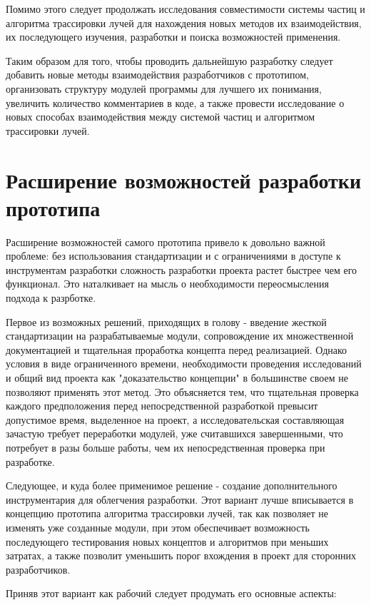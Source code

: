 Помимо этого следует продолжать исследования совместимости системы частиц и алгоритма трассировки лучей для нахождения новых методов их взаимодействия, их последующего изучения, разработки и поиска возможностей применения.

Таким образом для того, чтобы проводить дальнейшую разработку следует добавить новые методы взаимодействия разработчиков с прототипом, организовать структуру модулей программы для лучшего их понимания, увеличить количество комментариев в коде, а также провести исследование о новых способах взаимодействия между системой частиц и алгоритмом трассировки лучей.

\section{Расширение возможностей разработки прототипа}

Расширение возможностей самого прототипа привело к довольно важной проблеме: без использования стандартизации и с ограничениями в доступе к инструментам разработки сложность разработки проекта растет быстрее чем его функционал. Это наталкивает на мысль о необходимости переосмысления подхода к разрботке.

Первое из возможных решений, приходящих в голову - введение жесткой стандартизации на разрабатываемые модули, сопровождение их множественной документацией и тщательная проработка концепта перед реализацией. Однако условия в виде ограниченного времени, необходимости проведения исследований и общий вид проекта как "доказательство концепции" в большинстве своем не позволяют применять этот метод. Это объясняется тем, что тщательная проверка каждого предположения перед непосредственной разработкой превысит допустимое время, выделенное на проект, а исследовательская составляющая зачастую требует переработки модулей, уже считавшихся завершенными, что потребует в разы больше работы, чем их непосредственная проверка при разработке. 

Следующее, и куда более применимое решение - создание дополнительного инструментария для облегчения разработки. Этот вариант лучше вписывается в концепцию прототипа алгоритма трассировки лучей, так как позволяет не изменять уже созданные модули, при этом обеспечивает возможность последующего тестирования новых концептов и алгоритмов при меньших затратах, а также позволит уменьшить порог вхождения в проект для сторонних разработчиков.

Приняв этот вариант как рабочий следует продумать его основные аспекты:

